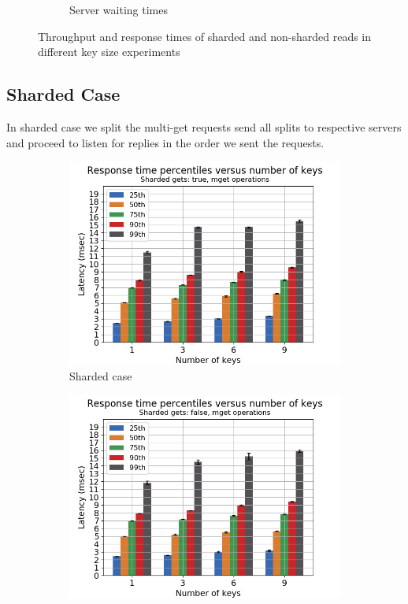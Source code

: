 \documentclass[11pt,a4paper]{article}
\begin{document}
\begin{figure}[h]
\begin{subfigure}{.5\textwidth}
  \caption{Server waiting times}
  \label{fig:gmg-mget-wtime_mw}
\end{subfigure}
\caption{Throughput and response times of sharded and non-sharded reads in different key size experiments}
\label{fig:gmg-mget_general}
\end{figure}

\subsection{Sharded Case} \label{sec:gmg-true}
In sharded case we split the multi-get requests send all splits to respective servers and proceed to listen for replies in the order we sent the requests.

\begin{figure}[h]
\begin{subfigure}{.5\textwidth}
  \centering
  \includegraphics[width=1.0\linewidth ,trim={5px 0px 20px 0px},clip]{img/plot/gmg-perc-mget-true.png}
  \caption{Sharded case}
  \label{fig:gmg-perc-true}
\end{subfigure}%
\begin{subfigure}{.5\textwidth}
  \centering
  \includegraphics[width=1.0\linewidth ,trim={5px 0px 20px 0px},clip]{img/plot/gmg-perc-mget-false.png}

\end{subfigure}
\end{figure}
\end{document}
